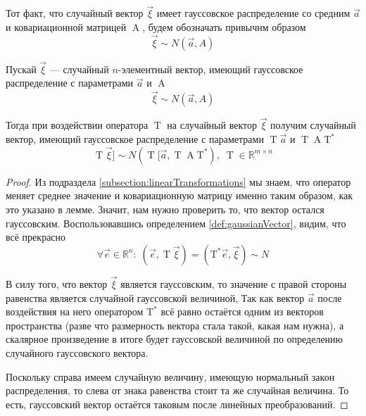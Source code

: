 \begin{definition}
    Тот факт, что случайный вектор $\vec{\xi}$ имеет гауссовское распределение
    со средним $\vec{a}$ и ковариационной матрицей
    $\operatorname{A}$, будем обозначать привычнм образом
    $$\vec{\xi} \sim N\left( \vec{a}, A \right)$$
\end{definition}

\begin{lemma}\label{lemma:gaussTransformed}
    Пускай $\vec{\xi}$ --- случайный $n$-элементный вектор, имеющий гауссовское
    распределение с параметрами $\vec{a}$ и $\operatorname{A}$
    $$\vec{\xi} \sim N\left( \vec{a}, A \right)$$

    Тогда при воздействии оператора $\operatorname{T}$ на случайный вектор
    $\vec{\xi}$ получим случайный вектор, имеющий гауссовское распределение с
    параметрами $\operatorname{T} \vec{a} $ и
    $\operatorname{T} \operatorname{A} \operatorname{T^*} $
    $$\operatorname{T} \vec{\xi}] \sim N\left( \operatorname{T}[\vec{a} ,
        \operatorname{T} \operatorname{A} \operatorname{T^*} \right),\;
        \operatorname{T} \in \mathbb{R}^{m \times n}$$
\end{lemma}
\begin{proof}
    Из подраздела \ref{subsection:linearTransformations} мы знаем, что оператор
    меняет среднее значение и ковариационную матрицу именно таким образом, как
    это указано в лемме. Значит, нам нужно проверить то, что вектор остался
    гауссовским. Воспользовавшись определением \ref{def:gaussianVector}, видим,
    что всё прекрасно
    $$\forall \vec{e} \in \mathbb{R}^n:\;
        \left( \vec{e}, \operatorname{T} \vec{\xi} \right)
            = \left( \operatorname{T^*} \vec{e} , \vec{\xi} \right) \sim N$$

    В силу того, что вектор $\vec{\xi}$ является гауссовским, то значение с
    правой стороны равенства является случайной гауссовской величиной, Так как
    вектор $\vec{a}$ после воздействия на него оператором $\operatorname{T^*}$ всё
    равно остаётся одним из векторов пространства (разве что размерность вектора
    стала такой, какая нам нужна), а скалярное произведение в итоге будет
    гауссовской величиной по определению случайного гауссовского вектора.

    Поскольку справа имеем случайную величину, имеющую нормальный закон
    распределения, то слева от знака равенства стоит та же случайная величина.
    То есть, гауссовский вектор остаётся таковым после линейных преобразований.
\end{proof}

